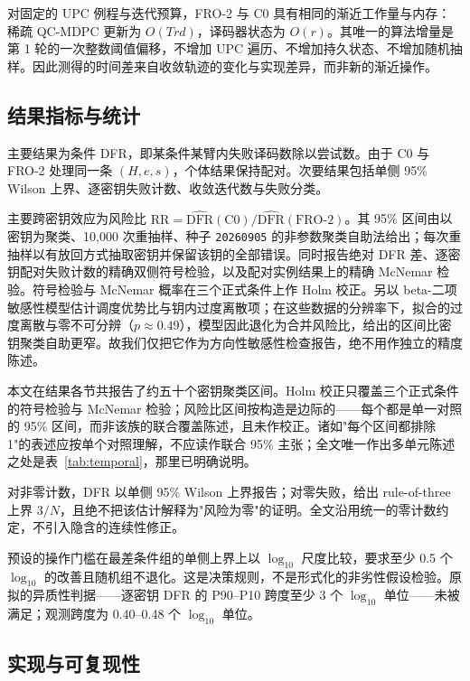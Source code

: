 \documentclass[UTF8,a4paper,10pt,twocolumn]{ctexart}
\begin{document}
对固定的 UPC 例程与迭代预算，FRO-2 与 C0 具有相同的渐近工作量与内存：稀疏 QC-MDPC 更新为 $O(Trd)$，译码器状态为 $O(r)$。其唯一的算法增量是第 1 轮的一次整数阈值偏移，不增加 UPC 遍历、不增加持久状态、不增加随机抽样。因此测得的时间差来自收敛轨迹的变化与实现差异，而非新的渐近操作。

\subsection{结果指标与统计}

主要结果为条件 DFR，即某条件某臂内失败译码数除以尝试数。由于 C0 与 FRO-2 处理同一条 $(H,e,s)$，个体结果保持配对。次要结果包括单侧 95\% Wilson 上界、逐密钥失败计数、收敛迭代数与失败分类。

主要跨密钥效应为风险比 $\mathrm{RR}=\widehat{\mathrm{DFR}}(\mathrm{C0})/\widehat{\mathrm{DFR}}(\mathrm{FRO\text{-}2})$。其 95\% 区间由以密钥为聚类、10{,}000 次重抽样、种子 \texttt{20260905} 的非参数聚类自助法给出；每次重抽样以有放回方式抽取密钥并保留该钥的全部错误。同时报告绝对 DFR 差、逐密钥配对失败计数的精确双侧符号检验，以及配对实例结果上的精确 McNemar 检验。符号检验与 McNemar 概率在三个正式条件上作 Holm 校正。另以 beta-二项敏感性模型估计调度优势比与钥内过度离散项；在这些数据的分辨率下，拟合的过度离散与零不可分辨（$p\approx0.49$），模型因此退化为合并风险比，给出的区间比密钥聚类自助更窄。故我们仅把它作为方向性敏感性检查报告，绝不用作独立的精度陈述。

本文在结果各节共报告了约五十个密钥聚类区间。Holm 校正只覆盖三个正式条件的符号检验与 McNemar 检验；风险比区间按构造是边际的——每个都是单一对照的 95\% 区间，而非该族的联合覆盖陈述，且未作校正。诸如"每个区间都排除 1"的表述应按单个对照理解，不应读作联合 95\% 主张；全文唯一作出多单元陈述之处是表~\ref{tab:temporal}，那里已明确说明。

对非零计数，DFR 以单侧 95\% Wilson 上界报告；对零失败，给出 rule-of-three 上界 $3/N$，且绝不把该估计解释为"风险为零"的证明。全文沿用统一的零计数约定，不引入隐含的连续性修正。

预设的操作门槛在最差条件组的单侧上界上以 $\log_{10}$ 尺度比较，要求至少 0.5 个 $\log_{10}$ 的改善且随机组不退化。这是决策规则，不是形式化的非劣性假设检验。原拟的异质性判据——逐密钥 DFR 的 P90--P10 跨度至少 3 个 $\log_{10}$ 单位——未被满足；观测跨度为 0.40--0.48 个 $\log_{10}$ 单位。

\subsection{实现与可复现性}
\end{document}
